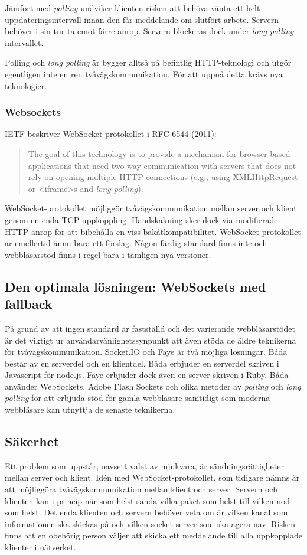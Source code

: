 Jämfört med \emph{polling} undviker klienten risken att behöva vänta ett helt uppdateringsintervall innan den får meddelande om slutfört arbete. Servern behöver i sin tur ta emot färre anrop. Servern blockeras dock under \emph{long polling}-intervallet.

Polling och \emph{long polling} är bygger alltså på befintlig HTTP-teknologi och utgör egentligen inte en ren tvåvägskommunikation. För att uppnå detta krävs nya teknologier.

\subsubsection{Websockets}
IETF beskriver WebSocket-protokollet i RFC 6544 (2011):

\begin{quote}
The goal of this technology is to provide a mechanism for browser-based applications that need two-way communication with servers that does not rely on opening multiple HTTP connections (e.g., using XMLHttpRequest or <iframe>s and \emph{long polling}).
\end{quote}

WebSocket-protokollet möjliggör tvåvägskommunikation mellan server och klient genom en enda TCP-uppkoppling. Handskakning sker dock via modifierade HTTP-anrop för att bibehålla en viss bakåtkompatibilitet.
WebSocket-protokollet är emellertid ännu bara ett förslag. Någon färdig standard finns inte och webbläsarstöd finns i regel bara i tämligen nya versioner.

\subsection{Den optimala lösningen: WebSockets med fallback}
På grund av att ingen standard är fastställd och det varierande webbläsarstödet är det viktigt ur användarvänlighetssynpunkt att även stöda de äldre teknikerna för tvåvägskommunikation.
Socket.IO och Faye är två möjliga lösningar. Båda består av en serverdel och en klientdel. Båda erbjuder en serverdel skriven i Javascript för node.js. Faye erbjuder dock även en server skriven i Ruby.
Båda använder WebSockets, Adobe Flash Sockets och olika metoder av \emph{polling} och \emph{long polling} för att erbjuda stöd för gamla webbläsare samtidigt som moderna webbläsare kan utnyttja de senaste teknikerna.

\subsection{Säkerhet}
Ett problem som uppstår, oavsett valet av mjukvara, är sändningsrättigheter mellan server och klient. Idén med WebSocket-protokollet, som tidigare nämns är att möjliggöra tvåvägskommunikation mellan klient och server. Servern och klienten kan i princip när som helst sända vilka paket som helst till vilken nod som helst. Det enda klienten och servern behöver veta om är vilken kanal som informationen ska skickas på och vilken socket-server som ska agera nav. Risken finns att en obehörig person väljer att skicka ett meddelande till alla uppkopplade klienter i nätverket.

